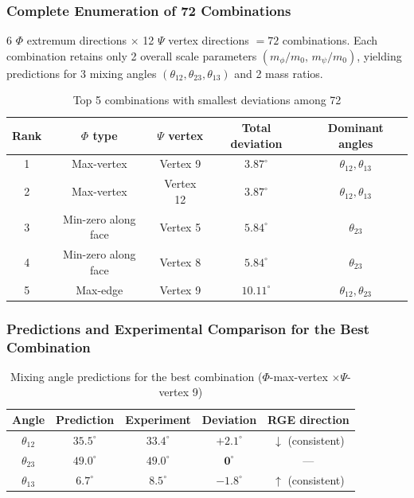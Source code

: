\subsubsection{Complete Enumeration of 72 Combinations}

6 $\Phi$ extremum directions $\times$ 12 $\Psi$ vertex directions $= 72$ combinations. Each combination retains only 2 overall scale parameters $(m_\phi/m_0, \, m_\psi/m_0)$, yielding predictions for 3 mixing angles $(\theta_{12}, \theta_{23}, \theta_{13})$ and 2 mass ratios.

\begin{table}[htbp]
\centering
\caption{Top 5 combinations with smallest deviations among 72}
\label{tab:72_combos_en}
\begin{tabular}{ccccc}
\hline
Rank & $\Phi$ type & $\Psi$ vertex & Total deviation & Dominant angles \\
\hline
1 & Max-vertex & Vertex 9 & $3.87^\circ$ & $\theta_{12},\theta_{13}$ \\
2 & Max-vertex & Vertex 12 & $3.87^\circ$ & $\theta_{12},\theta_{13}$ \\
3 & Min-zero along face & Vertex 5 & $5.84^\circ$ & $\theta_{23}$ \\
4 & Min-zero along face & Vertex 8 & $5.84^\circ$ & $\theta_{23}$ \\
5 & Max-edge & Vertex 9 & $10.11^\circ$ & $\theta_{12},\theta_{23}$ \\
\hline
\end{tabular}
\end{table}

\subsubsection{Predictions and Experimental Comparison for the Best Combination}

\begin{table}[htbp]
\centering
\caption{Mixing angle predictions for the best combination ($\Phi$-max-vertex $\times \Psi$-vertex 9)}
\label{tab:mixing_angles_en}
\begin{tabular}{ccccc}
\hline
Angle & Prediction & Experiment & Deviation & RGE direction \\
\hline
$\theta_{12}$ & $35.5^\circ$ & $33.4^\circ$ & $+2.1^\circ$ & $\downarrow$ (consistent) \\
$\theta_{23}$ & $49.0^\circ$ & $49.0^\circ$ & $\mathbf{0^\circ}$ & --- \\
$\theta_{13}$ & $6.7^\circ$ & $8.5^\circ$ & $-1.8^\circ$ & $\uparrow$ (consistent) \\
\hline
\end{tabular}
\end{table}

